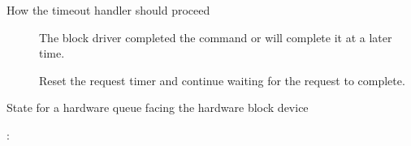 \documentclass[a4paper,11pt,english]{sphinxmanual}
\begin{document}
\begin{fulllineitems}
\label{\detokenize{blk-mq:c.blk_eh_timer_return}}
How the timeout handler should proceed

\end{fulllineitems}


\begin{description}
\item[{}] \leavevmode
The block driver completed the command or will complete it at
a later time.

\item[{}] \leavevmode
Reset the request timer and continue waiting for the
request to complete.

\end{description}

\begin{fulllineitems}
\label{\detokenize{blk-mq:c.blk_mq_hw_ctx}}
State for a hardware queue facing the hardware block device

\end{fulllineitems}


:
\end{document}
